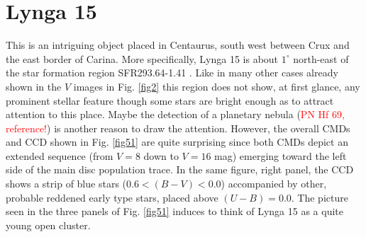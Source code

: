 \documentclass[draft]{aa}
\begin{document}
\section{Lynga 15}

This is an intriguing object placed in Centaurus, south west between Crux and
the east border of Carina. More specifically, Lynga 15 is about $1^\circ$
north-east of the star formation region SFR293.64-1.41 \citep{Avedisova_2002}.
Like in many other cases already shown in the $V$ images in Fig. \ref{fig2}
this region does not show, at first glance, any prominent stellar feature
though some stars are bright enough as to attract attention to this place.
Maybe the detection of a planetary nebula (\textcolor{red}{PN Hf 69,
reference!}) is another reason to draw the attention.
However, the overall CMDs and CCD shown in Fig. \ref{fig51}
are quite surprising since both CMDs depict an extended sequence (from $V = 8$
down to $V = 16$ mag) emerging toward the left side of the main disc population
trace. In the same figure, right panel, the CCD shows a strip of blue stars
($0.6<(B-V)<0.0$) accompanied by other, probable reddened early type stars,
placed above $(U-B) = 0.0$. The picture seen in the three panels of Fig.
\ref{fig51} induces to think of Lynga 15 as a quite young open cluster.\\
\end{document}
